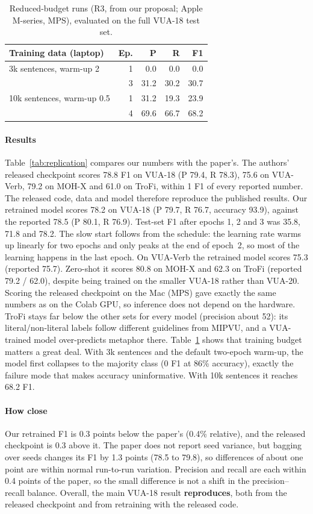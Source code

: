 \documentclass[11pt]{article}
\begin{document}
\begin{table}[t]
\centering\small
\begin{tabular}{lrrrr}
\toprule
Training data (laptop) & Ep. & P & R & F1 \\
\midrule
3k sentences, warm-up 2 & 1 & 0.0 & 0.0 & 0.0 \\
 & 3 & 31.2 & 30.2 & 30.7 \\
10k sentences, warm-up 0.5 & 1 & 31.2 & 19.3 & 23.9 \\
 & 4 & 69.6 & 66.7 & 68.2 \\
\bottomrule
\end{tabular}
\caption{Reduced-budget runs (R3, from our proposal; Apple M-series, MPS), evaluated on the full VUA-18 test set.}
\label{tab:pilot}
\end{table}

\paragraph{Results} Table~\ref{tab:replication} compares our numbers with the paper's. The authors' released checkpoint scores 78.8 F1 on VUA-18 (P 79.4, R 78.3), 75.6 on VUA-Verb, 79.2 on MOH-X and 61.0 on TroFi, within 1 F1 of every reported number. The released code, data and model therefore reproduce the published results. Our retrained model scores 78.2 on VUA-18 (P 79.7, R 76.7, accuracy 93.9), against the reported 78.5 (P 80.1, R 76.9). Test-set F1 after epochs 1, 2 and 3 was 35.8, 71.8 and 78.2. The slow start follows from the schedule: the learning rate warms up linearly for two epochs and only peaks at the end of epoch~2, so most of the learning happens in the last epoch. On VUA-Verb the retrained model scores 75.3 (reported 75.7). Zero-shot it scores 80.8 on MOH-X and 62.3 on TroFi (reported 79.2 / 62.0), despite being trained on the smaller VUA-18 rather than VUA-20. Scoring the released checkpoint on the Mac (MPS) gave exactly the same numbers as on the Colab GPU, so inference does not depend on the hardware. TroFi stays far below the other sets for every model (precision about 52): its literal/non-literal labels follow different guidelines from MIPVU, and a VUA-trained model over-predicts metaphor there. Table~\ref{tab:pilot} shows that training budget matters a great deal. With 3k sentences and the default two-epoch warm-up, the model first collapses to the majority class (0 F1 at 86\% accuracy), exactly the failure mode that makes accuracy uninformative. With 10k sentences it reaches 68.2 F1. \paragraph{How close} Our retrained F1 is 0.3 points below the paper's (0.4\% relative), and the released checkpoint is 0.3 above it. The paper does not report seed variance, but bagging over seeds changes its F1 by 1.3 points (78.5 to 79.8), so differences of about one point are within normal run-to-run variation. Precision and recall are each within 0.4 points of the paper, so the small difference is not a shift in the precision--recall balance. Overall, the main VUA-18 result \textbf{reproduces}, both from the released checkpoint and from retraining with the released code.
\end{document}
